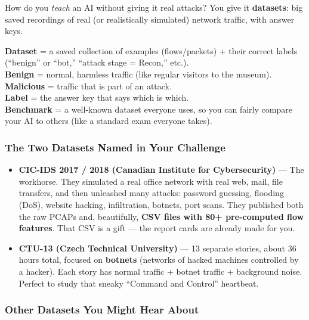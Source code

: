 \documentclass[11pt,a4paper]{article}
\begin{document}
How do you \emph{teach} an AI without giving it real attacks? You give it
\textbf{datasets}: big saved recordings of real (or realistically simulated)
network traffic, with answer keys.

\begin{jargonbox}
\textbf{Dataset} = a saved collection of examples (flows/packets) + their
correct labels (``benign'' or ``bot,'' ``attack stage = Recon,'' etc.).\\
\textbf{Benign} = normal, harmless traffic (like regular visitors to the museum).\\
\textbf{Malicious} = traffic that is part of an attack.\\
\textbf{Label} = the answer key that says which is which.\\
\textbf{Benchmark} = a well-known dataset everyone uses, so you can fairly
compare your AI to others (like a standard exam everyone takes).
\end{jargonbox}

\subsubsection{The Two Datasets Named in Your Challenge}

\begin{itemize}[leftmargin=1.6em,itemsep=2pt]
  \item \textbf{CIC-IDS 2017 / 2018 (Canadian Institute for Cybersecurity)} ---
        The workhorse. They simulated a real office network with real web, mail,
        file transfers, and then unleashed many attacks: password guessing,
        flooding (DoS), website hacking, infiltration, botnets, port scans.
        They published both the raw PCAPs and, beautifully, \textbf{CSV files
        with 80+ pre-computed flow features}. That CSV is a gift --- the report
        cards are already made for you.

  \item \textbf{CTU-13 (Czech Technical University)} --- 13 separate stories,
        about 36 hours total, focused on \textbf{botnets} (networks of hacked
        machines controlled by a hacker). Each story has normal traffic +
        botnet traffic + background noise. Perfect to study that sneaky
        ``Command and Control'' heartbeat.
\end{itemize}

\subsubsection{Other Datasets You Might Hear About}
\end{document}
